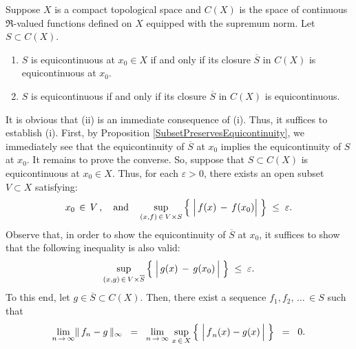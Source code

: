 \begin{proposition}
\label{ClosurePreservesEquicontinuity}
\mbox{}\vskip 0.1cm
\noindent
Suppose $X$ is a compact topological space and
$C(X)$ is the space of continuous $\Re$-valued functions defined on $X$ equipped with the supremum norm.
Let $S \subset C(X)$.
\begin{enumerate}
\item	$S$ is equicontinuous at $x_{0} \in X$ if and only if its closure $\overline{S}$ in $C(X)$ is equicontinuous at $x_{0}$.
\item	$S$ is equicontinuous if and only if its closure $\overline{S}$ in $C(X)$ is equicontinuous.
\end{enumerate}
\end{proposition}
\proof
It is obvious that (ii) is an immediate consequence of (i).
Thus, it suffices to establish (i).
First, by Proposition \ref{SubsetPreservesEquicontinuity}, we immediately see that
the equicontinuity of $\overline{S}$ at $x_{0}$ implies the equicontinuity of $S$ at $x_{0}$.
It remains to prove the converse.
So, suppose that $S \subset C(X)$ is equicontinuous at $x_{0} \in X$.
Thus, for each $\varepsilon > 0$, there exists an open subset $V \subset X$ satisfying:
\begin{equation*}
x_{0} \,\in\, V\,,
\quad\textnormal{and}\quad
\sup_{(x,f) \,\in\, V \times S}\left\{\;\left\vert\,\overset{{\color{white}.}}{f}(x)\,-\,f(x_{0})\right\vert\;\right\}
\;\leq\; \varepsilon.
\end{equation*}
Observe that, in order to show the equicontinuity of $\overline{S}$ at $x_{0}$, it suffices to show that
the following inequality is also valid:
\begin{equation*}
\sup_{(x,g) \,\in\, V \times \overline{S}}\left\{\;\left\vert\,\overset{{\color{white}1}}{g}(x)\,-\,g(x_{0})\,\right\vert\;\right\}
\;\leq\; \varepsilon.
\end{equation*}
To this end, let $g \in \overline{S} \subset C(X)$.
Then, there exist a sequence $f_{1}, f_{2},\,\ldots\,\in S$ such that
\begin{equation*}
\underset{n\,\rightarrow\,\infty}{\lim}\Vert\,f_{n} - g\,\Vert_{\infty}
\;\; = \;\; \underset{n\,\rightarrow\,\infty}{\lim}\,\sup_{x\,\in\,X}\left\{\; \left\vert\, \overset{{\color{white}.}}{f}_{n}(x) - g(x)\,\right\vert \;\right\}
\;\; = \;\; 0.
\end{equation*}
